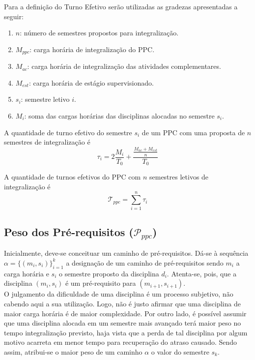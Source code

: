 \documentclass[a4paper, 12pt]{article}
\begin{document}
Para a definição do Turno Efetivo serão utilizadas as gradezas apresentadas a seguir: \\

\begin{enumerate}
\item $n$: número de semestres propostos para integralização.
\item $M_{ppc}$: carga horária de integralização do PPC.
\item $M_{ac}$: carga horária de integralização das atividades complementares.
\item $M_{est}$: carga horária de estágio supervisionado.
\item $s_i$: semestre letivo $i$.
\item $M_i$: soma das cargas horárias das disciplinas alocadas no semestre $s_i$.
\end{enumerate}

\begin{definicao}
A quantidade de turno efetivo do semestre $s_i$ de um PPC com uma proposta de $n$ semestres  de integralização é \\

$$\tau_i = 2\frac{M_i}{T_0} + \frac{\frac{M_{ac}+M_{est}}{n}}{T_0}$$
\end{definicao}

\begin{definicao}
A quantidade de turnos efetivos do PPC com $n$ semestres letivos de integralização é \\
$$\mathcal{T}_{ppc} = \sum_{i = 1}^{n} \tau_i$$
\end{definicao}

\subsection*{Peso dos Pré-requisitos ($\mathcal{P}_{ppc}$)}

Inicialmente, deve-se conceituar um caminho de pré-requisitos. Dá-se à sequência $\alpha = \{ (m_i, s_i) \}_{i=1}^k$ a designação de um caminho de 
pré-requisitos sendo $m_i$ a carga horária e $s_i$ o semestre proposto da disciplina $d_i$. Atenta-se, pois, que a disciplina $(m_i, s_i)$ é um pré-requisito 
para $(m_{i+1}, s_{i+1})$. \\ 

O julgamento da dificuldade de uma disciplina é um processo subjetivo, não cabendo aqui a sua utilização. Logo, não é justo afirmar que uma disciplina de 
maior carga horária é de maior complexidade. Por outro lado, é possível assumir que uma disciplina alocada em um semestre mais avançado terá maior peso no 
tempo integralização previsto, haja vista que a perda de tal disciplina por algum motivo acarreta em menor tempo para recuperação do atraso causado.
Sendo assim, atribui-se o maior peso de um caminho $\alpha$ o valor do semestre $s_k$. \\
\end{document}
